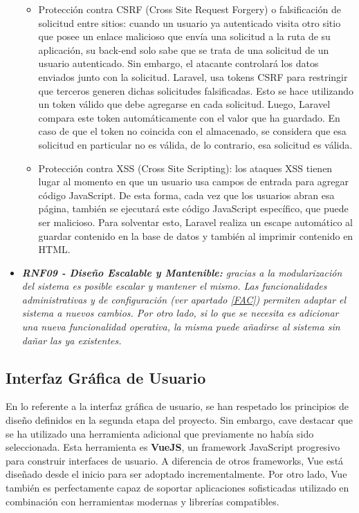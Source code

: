 \documentclass[11pt,oneside]{book}
\begin{document}
\begin{itemize}
{\begin{itemize}
\item Protección contra CSRF (Cross Site Request Forgery) o falsificación de solicitud entre sitios: cuando un usuario ya autenticado visita otro sitio que posee un enlace malicioso que envía una solicitud a la ruta de su aplicación, su back-end solo sabe que se trata de una solicitud de un usuario autenticado. Sin embargo, el atacante controlará los datos enviados junto con la solicitud. Laravel, usa tokens CSRF para restringir que terceros generen dichas solicitudes falsificadas. Esto se hace utilizando un token válido que debe agregarse en cada solicitud. Luego, Laravel compara este token automáticamente con el valor que ha guardado. En caso de que el token no coincida con el almacenado, se considera que esa solicitud en particular no es válida, de lo contrario, esa solicitud es válida.
\item Protección contra XSS (Cross Site Scripting): los ataques XSS tienen lugar al momento en que un usuario usa campos de entrada para agregar código JavaScript. De esta forma, cada vez que los usuarios abran esa página, también se ejecutará este código JavaScript específico, que puede ser malicioso. Para solventar esto, Laravel realiza un escape automático al guardar contenido en la base de datos y también al imprimir contenido en HTML.
\end{itemize}}
\item \textit{\textbf{RNF09 - Diseño Escalable y Mantenible:} gracias a la modularización del sistema es posible escalar y mantener el mismo. Las funcionalidades administrativas y de configuración (ver apartado \eqref{FAC}) permiten adaptar el sistema a nuevos cambios. Por otro lado, si lo que se necesita es adicionar una nueva funcionalidad operativa, la misma puede añadirse al sistema sin dañar las ya existentes.}
\end{itemize}

\subsection{Interfaz Gráfica de Usuario}
En lo referente a la interfaz gráfica de usuario, se han respetado los principios de diseño definidos en la segunda etapa del proyecto. Sin embargo, cave destacar que se ha utilizado una herramienta adicional que previamente no había sido seleccionada. Esta herramienta es \textbf{VueJS}, un framework JavaScript progresivo para construir interfaces de usuario. A diferencia de otros frameworks, Vue está diseñado desde el inicio para ser adoptado incrementalmente. Por otro lado, Vue también es perfectamente capaz de soportar aplicaciones sofisticadas utilizado en combinación con herramientas modernas y librerías compatibles.
\end{document}

